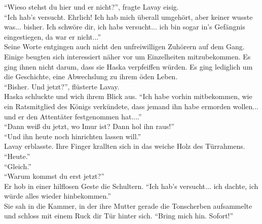``Wieso stehst du hier und er nicht?'', fragte Lavay eisig.\\
``Ich hab's versucht. Ehrlich! Ich hab mich überall umgehört, aber keiner wusste was... bisher. Ich 
schwöre dir, ich habs versucht... ich bin sogar in's Gefängnis eingestiegen, da war er nicht...''\\
Seine Worte entgingen auch nicht den unfreiwilligen Zuhörern auf dem Gang. Einige beugten sich 
interessiert näher vor um Einzelheiten mitzubekommen. Es ging ihnen nicht darum, dass sie Haska 
verpfeiffen würden. Es ging lediglich um die Geschichte, eine Abwechslung zu ihrem öden Leben.\\
``Bisher. Und jetzt?'', flüsterte Lavay.\\
Haska schluckte und wich ihrem Blick aus. ``Ich habe vorhin mitbekommen, wie ein Ratsmitglied des 
Königs verkündete, dass jemand ihn habe ermorden wollen... und er den Attentäter festgenommen 
hat....''\\
``Dann weiß du jetzt, wo Imur ist? Dann hol ihn raus!''\\
``Und ihn heute noch hinrichten lassen will.''\\
Lavay erblasste. Ihre Finger krallten sich in das weiche Holz des Türrahmens. ``Heute.''\\
``Gleich.''\\
``Warum kommst du erst jetzt?''\\
Er hob in einer hilflosen Geste die Schultern. ``Ich hab's versucht... ich dachte, ich würde alles 
wieder hinbekommen.''\\
Sie sah in die Kammer, in der ihre Mutter gerade die Tonscherben aufsammelte und schloss mit einem 
Ruck dir Tür hinter sich. ``Bring mich hin. Sofort!''\\
